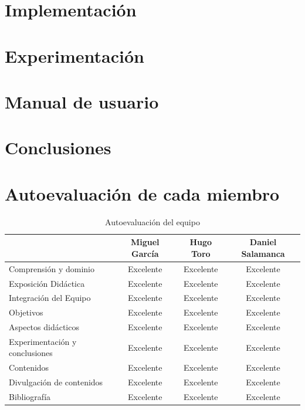 \documentclass{article}
\begin{document}
\section{Implementación}

\section{Experimentación}

\section{Manual de usuario}

\section{Conclusiones}

\section{Autoevaluación de cada miembro}
\begin{table}[H]
    \centering
    \small
    \begin{tabular}{|l|c|c|c|}
        \hline
        & \textbf{Miguel García} & \textbf{Hugo Toro} & \textbf{Daniel Salamanca} \\ \hline
        Comprensión y dominio        & Excelente & Excelente & Excelente \\ \hline
        Exposición Didáctica         & Excelente & Excelente & Excelente \\ \hline
        Integración del Equipo       & Excelente & Excelente & Excelente \\ \hline
        Objetivos                    & Excelente & Excelente & Excelente \\ \hline
        Aspectos didácticos          & Excelente & Excelente & Excelente \\ \hline
        Experimentación y conclusiones & Excelente & Excelente & Excelente \\ \hline
        Contenidos                   & Excelente & Excelente & Excelente \\ \hline
        Divulgación de contenidos    & Excelente & Excelente & Excelente \\ \hline
        Bibliografía                 & Excelente & Excelente & Excelente \\ \hline
    \end{tabular}
    \caption{Autoevaluación del equipo}
    \label{tab:autoevaluacion}
\end{table}
\end{document}

